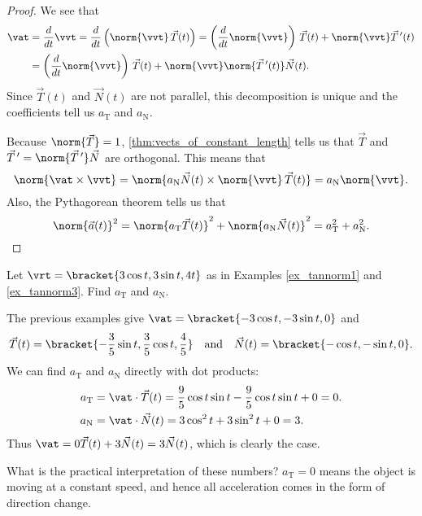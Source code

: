 \begin{proof}
We see that
\begin{align*}
 \vat
 &=\frac d{dt}\vvt=\frac d{dt}\left(\norm{\vvt}\,\vec T(t)\right)
 =\left(\frac d{dt}\norm{\vvt}\right)\,\vec T(t)+\norm{\vvt}\vec T\,'(t) \\
 &=\left(\frac d{dt}\norm{\vvt}\right)\,\vec T(t)+\norm{\vvt}\norm{\vec T\,'(t)}\vec N(t).
\end{align*}
Since $\vec T(t)$ and $\vec N(t)$ are not parallel, this decomposition is unique and the coefficients tell us $a_\text{T}$ and $a_\text{N}$.

Because $\norm{\vec T}=1$, \autoref{thm:vects_of_constant_length} tells us that $\vec T$ and $\vec T\,'=\norm{\vec T\,'}\vec N$ are orthogonal.  This means that
\[
 \norm{\vat\times\vvt}
 =\norm{a_\text{N}\vec N(t)\times\norm{\vvt}\,\vec T(t)}
 =a_\text{N}\norm{\vvt}.
\]
Also, the Pythagorean theorem tells us that
\[
 \norm{\vec a(t)}^2=\norm{a_\text{T}\vec T(t)}^2+\norm{a_\text{N}\vec N(t)}^2
 =a_\text{T}^2+a_\text{N}^2.\qedhere
\]
\end{proof}

{Let $\vrt =\bracket{3\cos t, 3\sin t, 4t}$ as in Examples \ref{ex_tannorm1} and \ref{ex_tannorm3}. Find $a_\text{T}$ and $a_\text{N}$.}
{The previous examples give $\vat =\bracket{-3\cos t,-3\sin t,0}$ and 
\[\vec T(t) =\bracket{-\frac35\sin t,\frac35\cos t,\frac45}\quad \text{and}\quad \vec N(t) =\bracket{-\cos t,-\sin t,0}.\]
We can find $a_\text{T}$ and $a_\text{N}$ directly with dot products:
\begin{align*}
a_\text{T} &= \vat\cdot \vec T(t) = \frac95\cos t\sin t-\frac95\cos t\sin t+0 = 0.\\
a_\text{N} &= \vat\cdot \vec N(t) = 3\cos^2t+3\sin^2t + 0 = 3.
\end{align*}
Thus $\vat = 0\vec T(t) + 3\vec N(t) = 3\vec N(t)$, which is clearly the case.

What is the practical interpretation of these numbers? $a_\text{T}=0$ means the object is moving at a constant speed, and hence all acceleration comes in the form of direction change.}

